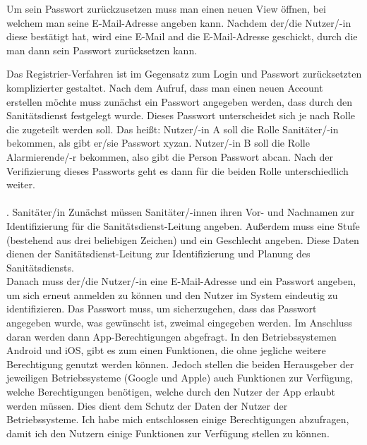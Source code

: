             \noindent Um sein Passwort zurückzusetzen muss man einen neuen View öffnen, bei welchem man seine E-Mail-Adresse
            angeben kann. Nachdem der/die Nutzer/-in diese bestätigt hat, wird eine E-Mail and die E-Mail-Adresse geschickt, durch die man dann sein Passwort 
            zurücksetzen kann.

            \noindent Das Registrier-Verfahren ist im Gegensatz zum Login und Passwort zurücksetzten komplizierter gestaltet.
            Nach dem Aufruf, dass man einen neuen Account erstellen möchte muss zunächst ein Passwort angegeben werden, dass
            durch den Sanitätsdienst festgelegt wurde. Dieses Passwort unterscheidet sich je nach Rolle die zugeteilt werden soll.
            Das heißt: Nutzer/-in A soll die Rolle Sanitäter/-in bekommen, als gibt er/sie Passwort \glqq xyz\grqq an.
            Nutzer/-in B soll die Rolle Alarmierende/-r bekommen, also gibt die Person Passwort \glqq abc\grqq an.
            \newline
            \noindent Nach der Verifizierung dieses Passworts geht es dann für die beiden Rolle unterschiedlich weiter. 
            \\\\
            . Sanitäter/in
            \newline Zunächst müssen Sanitäter/-innen ihren Vor- und Nachnamen zur Identifizierung für die Sanitätsdienst-Leitung angeben.
            Außerdem muss eine Stufe (bestehend aus drei beliebigen Zeichen) und ein Geschlecht angeben. Diese Daten dienen der Sanitätsdienst-Leitung
            zur Identifizierung und Planung des Sanitätsdiensts.\\
            Danach muss der/die Nutzer/-in eine E-Mail-Adresse und ein Passwort angeben, um sich erneut anmelden zu können und den Nutzer im System eindeutig zu
            identifizieren. Das Passwort muss, um sicherzugehen, dass das Passwort angegeben wurde, was gewünscht ist, zweimal eingegeben werden.
            Im Anschluss daran werden dann App-Berechtigungen abgefragt. 
            In den Betriebssystemen Android und iOS, gibt es zum einen Funktionen, die ohne jegliche weitere Berechtigung genutzt werden können. Jedoch stellen die beiden
            Herausgeber der jeweiligen Betriebssysteme (Google und Apple) auch Funktionen zur Verfügung, welche Berechtigungen benötigen, welche durch den Nutzer der App erlaubt werden müssen.
            Dies dient dem Schutz der Daten der Nutzer der Betriebssysteme.
            Ich habe mich entschlossen einige Berechtigungen abzufragen, damit ich den Nutzern einige Funktionen zur Verfügung stellen zu können.
